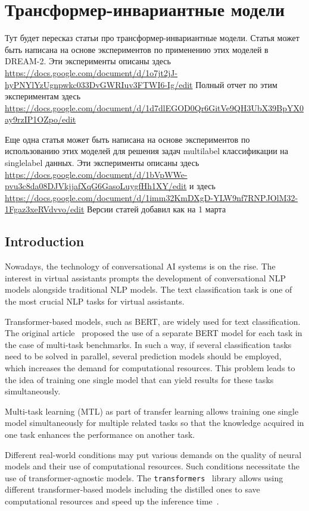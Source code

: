 \chapter{Трансформер-инвариантные модели}\label{ch:tr-ag}

Тут будет пересказ статьи про трансформер-инвариантные модели. 
Статья может быть написана на основе экспериментов по применению этих моделей в DREAM-2. Эти эксперименты описаны здесь \url{https://docs.google.com/document/d/1o7jt2jJ-hyPNYlYzUgnpwkc033DvGWRIuv3FTWI6-Ig/edit}
Полный отчет по этим экспериментам здесь \url{https://docs.google.com/document/d/1d7dlEGOD0Qr6GitVe9QH3UbX39BpYX0ay9rzIP1OZpo/edit}

Еще одна статья может быть написана на основе экспериментов по использованию этих моделей для решения задач multilabel классификации на singlelabel данных. Эти эксперименты описаны здесь
\url{https://docs.google.com/document/d/1bVpWWe-pvu3c8da08DJVkjjafXqG6GasoLuygfHh1XY/edit}
и здесь 
\url{https://docs.google.com/document/d/1imm32KmDXgD-YLW9nf7RNPJOlM32-1Fgaz3xeRVdvvo/edit}
Версии статей добавил как на 1 марта
\iffalse
\section{Introduction}
Nowadays, the technology of conversational AI systems is on the rise. The interest in virtual assistants prompts the development of conversational NLP models alongside traditional NLP models. The text classification task is one of the most crucial NLP tasks for virtual assistants.

Transformer-based models, such as BERT, are widely used for text classification. The original article~\cite{bert} proposed the use of a separate BERT model for each task in the case of multi-task benchmarks. In such a way, if several classification tasks need to be solved in parallel, several prediction models should be employed, which increases the demand for computational resources. This problem leads to the idea of training one single model that can yield results for these tasks simultaneously. 

Multi-task learning (MTL) as part of transfer learning allows training one single model simultaneously for multiple related tasks so that the knowledge acquired in one task enhances the performance on another task.

Different real-world conditions may put various demands on the quality of neural models and their use of computational resources. Such conditions necessitate the use of transformer-agnostic models. The \texttt{transformers}~\cite{huggingface_transformers} library allows using different transformer-based models including the distilled ones to save computational resources and speed up the inference time~\cite{alina}. 

